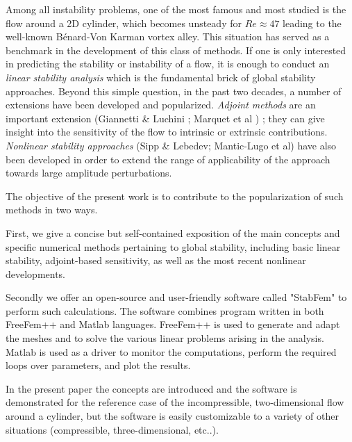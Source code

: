 \documentclass{elsarticle}
\begin{document}
Among all instability problems, one of the most famous and most studied is the flow around a 2D cylinder, which becomes unsteady for $Re \approx 47$ leading to the well-known Bénard-Von Karman vortex alley. This situation has served as a benchmark in the development of this class of methods.  
If one is only interested in predicting the stability or instability of a flow, it is enough to conduct an  {\em linear stability analysis} which is the fundamental brick of global stability approaches. 
Beyond this simple question, in the past two decades, a number of extensions have been developed and popularized.  {\em Adjoint methods} are an important extension (Giannetti \& Luchini ; Marquet et al ) ; they can give insight into the sensitivity of the flow to intrinsic or extrinsic contributions. 
{\em Nonlinear stability approaches} (Sipp \& Lebedev; Mantic-Lugo et al) have also been developed in order to extend the range of applicability of the approach towards large amplitude perturbations.






The objective of the present work is to contribute to the popularization of such methods 
in two ways.

First, we give a concise but self-contained exposition of the main concepts and 
specific numerical methods pertaining to global stability, including basic linear stability, adjoint-based sensitivity, as well as the most recent nonlinear developments.

Secondly we offer an open-source and user-friendly software called  "StabFem" to perform such calculations. The software combines program written in both FreeFem++ and Matlab languages. 
FreeFem++ is used to generate and adapt the meshes and to solve the various linear problems arising in the analysis. Matlab is used as a driver to monitor the computations, perform the required loops over parameters, and plot the results.

In the present paper the concepts are introduced and the software is demonstrated for the reference case of the incompressible, two-dimensional flow around a cylinder, but the software is easily customizable to a variety of other situations (compressible, three-dimensional, etc..).
\end{document}
